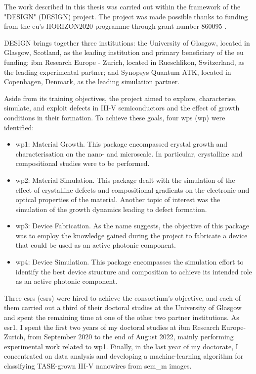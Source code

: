 The work described in this thesis was carried out within the framework of the "\acl{DESIGN}" (\acs{DESIGN}) project. The project was made possible thanks to funding from the \acl{eu}'s HORIZON2020 programme through grant number 860095 \cite{CordisDESIGN}.
\par
\Acs{DESIGN} brings together three institutions: the University of Glasgow, located in Glasgow, Scotland, as the leading institution and primary beneficiary of the \acs{eu} funding; \acs{ibm} Research Europe - Zurich, located in Rueschlikon, Switzerland, as the leading experimental partner; and Synopsys Quantum ATK, located in Copenhagen, Denmark, as the leading simulation partner.
\par
Aside from its training objectives, the project aimed to explore, characterise, simulate, and exploit defects in III-V semiconductors and the effect of growth conditions in their formation. To achieve these goals, four \acl{wp}s (\acs{wp}) were identified:
\begin{itemize}
    \item \acs{wp}1: Material Growth. This package encompassed crystal growth and characterisation on the nano- and microscale. In particular, crystalline and compositional studies were to be performed.
    \item \acs{wp}2: Material Simulation. This package dealt with the simulation of the effect of crystalline defects and compositional gradients on the electronic and optical properties of the material. Another topic of interest was the simulation of the growth dynamics leading to defect formation.
    \item \acs{wp}3: Device Fabrication. As the name suggests, the objective of this package was to employ the knowledge gained during the project to fabricate a device that could be used as an active photonic component.
    \item \acs{wp}4: Device Simulation. This package encompasses the simulation effort to identify the best device structure and composition to achieve its intended role as an active photonic component.
\end{itemize}
\par
Three \acl{esr}s (\acs{esr}s) were hired to achieve the consortium's objective, and each of them carried out a third of their doctoral studies at the University of Glasgow and spent the remaining time at one of the other two partner institutions. As \acs{esr}1, I spent the first two years of my doctoral studies at \acs{ibm} Research Europe- Zurich, from September 2020 to the end of August 2022, mainly performing experimental work related to \acs{wp}1. Finally, in the last year of my doctorate, I concentrated on data analysis and developing a machine-learning algorithm for classifying \acs{TASE}-grown III-V nanowires from \acf{sem_m} images.